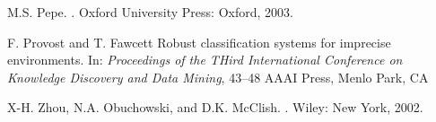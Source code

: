 \documentclass{article}
\begin{document}
\begin{thebibliography}{10}
M.S. Pepe.
.
\newblock Oxford University Press: Oxford, 2003.

F. Provost and T. Fawcett
\newblock Robust classification systems for imprecise environments.
\newblock In: \emph{Proceedings of the THird International Conference on Knowledge 
 Discovery and Data Mining}, 43--48
\newblock AAAI Press, Menlo Park, CA

X-H. Zhou, N.A. Obuchowski, and D.K. McClish.
.
\newblock Wiley: New York, 2002.

\end{thebibliography}






\end{document}

